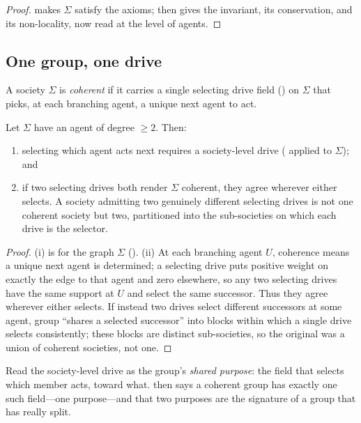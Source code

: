 \documentclass[11pt,twocolumn,a4paper]{article}
\newcommand{\Soc}{\Sigma}            %
\begin{document}
\begin{proof}
 makes $\Soc$ satisfy the axioms;
 then gives the invariant, its conservation, and its
non-locality, now read at the level of agents.
\end{proof}

\subsection{One group, one drive}

\begin{definition}
\label{def:coherent}
A society $\Soc$ is \emph{coherent} if it carries a single selecting drive
field () on $\Soc$ that picks, at each branching agent, a
unique next agent to act.
\end{definition}

\begin{theorem}
\label{thm:onedrive}
Let $\Soc$ have an agent of degree $\ge2$. Then:
\begin{enumerate}[label=\textup{(\roman*)},leftmargin=2.2em]
\item selecting which agent acts next requires a society-level drive
( applied to $\Soc$); and
\item if two selecting drives both render $\Soc$ coherent, they agree
wherever either selects. A society admitting two genuinely different
selecting drives is not one coherent society but two, partitioned into the
sub-societies on which each drive is the selector.
\end{enumerate}
\end{theorem}

\begin{proof}
(i) is  for the graph $\Soc$ ().
(ii) At each branching agent $U$, coherence means a unique next agent is
determined; a selecting drive puts positive weight on exactly the edge to
that agent and zero elsewhere, so any two selecting drives have the same
support at $U$ and select the same successor. Thus they agree wherever
either selects. If instead two drives select different successors at some
agent, group ``shares a selected successor'' into blocks within which a
single drive selects consistently; these blocks are distinct
sub-societies, so the original was a union of coherent societies, not one.
\end{proof}

\begin{remark}
\label{rem:schism}
Read the society-level drive as the group's \emph{shared purpose}: the
field that selects which member acts, toward what. 
then says a coherent group has exactly one such field---one purpose---and
that two purposes are the signature of a group that has really split.
\end{remark}
\end{document}
